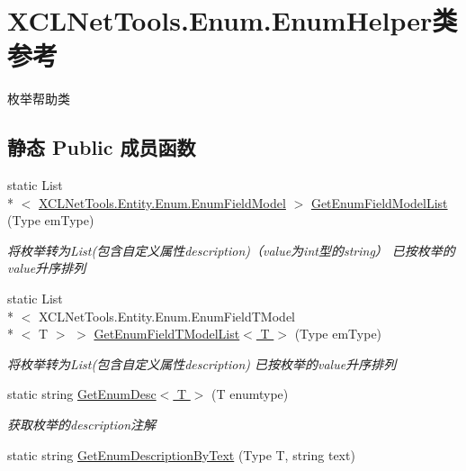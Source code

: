 \hypertarget{class_x_c_l_net_tools_1_1_enum_1_1_enum_helper}{\section{X\-C\-L\-Net\-Tools.\-Enum.\-Enum\-Helper类 参考}
\label{class_x_c_l_net_tools_1_1_enum_1_1_enum_helper}
}


枚举帮助类  


\subsection*{静态 Public 成员函数}
\begin{DoxyCompactItemize}
\item 
static List\\*
$<$ \hyperlink{class_x_c_l_net_tools_1_1_entity_1_1_enum_1_1_enum_field_model}{X\-C\-L\-Net\-Tools.\-Entity.\-Enum.\-Enum\-Field\-Model} $>$ \hyperlink{class_x_c_l_net_tools_1_1_enum_1_1_enum_helper_acdcc3f9200705cc0831c1395f5d2c51e}{Get\-Enum\-Field\-Model\-List} (Type em\-Type)
\begin{DoxyCompactList}\small\item\em 将枚举转为\-List(包含自定义属性description)（value为int型的string） 已按枚举的value升序排列 \end{DoxyCompactList}\item 
static List\\*
$<$ X\-C\-L\-Net\-Tools.\-Entity.\-Enum.\-Enum\-Field\-T\-Model\\*
$<$ T $>$ $>$ \hyperlink{class_x_c_l_net_tools_1_1_enum_1_1_enum_helper_a919aa80b589b8038b8db6f731b50556d}{Get\-Enum\-Field\-T\-Model\-List$<$ T $>$} (Type em\-Type)
\begin{DoxyCompactList}\small\item\em 将枚举转为\-List(包含自定义属性description) 已按枚举的value升序排列 \end{DoxyCompactList}\item 
static string \hyperlink{class_x_c_l_net_tools_1_1_enum_1_1_enum_helper_a3445493f9dd4798778af8ecfb2062b1b}{Get\-Enum\-Desc$<$ T $>$} (T enumtype)
\begin{DoxyCompactList}\small\item\em 获取枚举的description注解 \end{DoxyCompactList}\item 
static string \hyperlink{class_x_c_l_net_tools_1_1_enum_1_1_enum_helper_ac1c67f6247644347ed4673965832feaf}{Get\-Enum\-Description\-By\-Text} (Type T, string text)

\end{DoxyCompactItemize}
